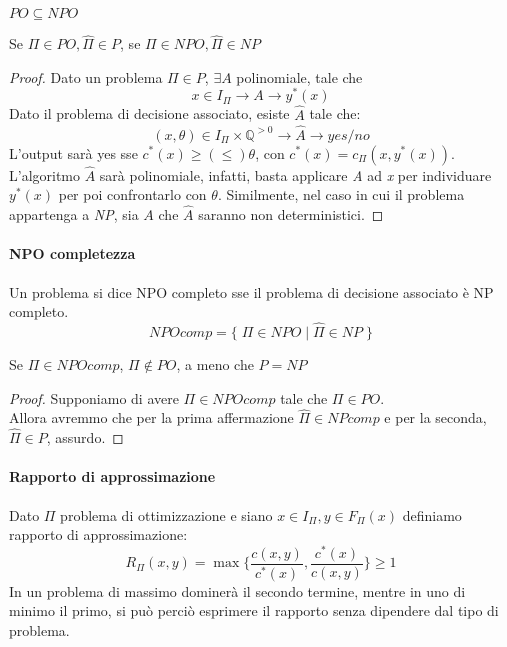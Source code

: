 \begin{theorem}
    $PO \subseteq NPO$
\end{theorem}
\begin{theorem}
    Se $\Pi \in \mathit{PO}, \hat{\Pi} \in P$, 
    se $\Pi \in \mathit{NPO}, \hat{\Pi} \in \mathit{NP}$ 
\end{theorem}
\begin{proof}
    Dato un problema $\Pi \in P$, $\exists A$ polinomiale, tale che
    $$x \in I_\Pi \longrightarrow A \longrightarrow y^*(x)$$
    Dato il problema di decisione associato, esiste $\hat{A}$ tale che:
    $$(x, \theta) \in I_\Pi \times \mathbb{Q}^{>0} \longrightarrow \hat{A} \longrightarrow yes/no$$
    L'output sarà yes sse $c^*(x) \geq (\leq) \theta$, con $c^*(x) = c_\Pi(x, y^*(x))$.\\
    
    L'algoritmo $\hat{A}$ sarà polinomiale, infatti, basta applicare \emph{A} ad \emph{x} 
    per individuare $y^*(x)$ per poi confrontarlo con $\theta$. 
    Similmente, nel caso in cui il problema appartenga a \emph{NP}, sia $A$ che $\hat{A}$ saranno non
    deterministici.
\end{proof}

\paragraph{NPO completezza}
Un problema si dice NPO completo sse il problema di decisione associato è NP completo.\\
$$\mathit{NPOcomp} = \{\;\Pi \in \mathit{NPO}\;|\;\hat{\Pi} \in \mathit{NP}\;\}$$

\begin{theorem}
    Se $\Pi \in \mathit{NPOcomp}$, $\Pi \notin PO$, a meno che $P=NP$
\end{theorem}
\begin{proof}
    Supponiamo di avere $\Pi \in \mathit{NPOcomp}$ tale che $\Pi \in PO$.\\
    Allora avremmo che per la prima affermazione $\hat{\Pi} \in \mathit{NPcomp}$ e per la seconda, 
    $\hat{\Pi} \in P$, assurdo.
\end{proof}

\paragraph{Rapporto di approssimazione}
Dato $\Pi$ problema di ottimizzazione e siano $x \in I_\Pi, y \in F_\Pi(x)$ definiamo
rapporto di approssimazione:
$$R_\Pi(x, y) = \max\bigg\{\frac{c(x, y)}{c^*(x)}, \frac{c^*(x)}{c(x, y)}\bigg\}\geq 1$$
In un problema di massimo dominerà il secondo termine, mentre in uno di minimo il primo, 
si può perciò esprimere il rapporto senza dipendere dal tipo di problema.

